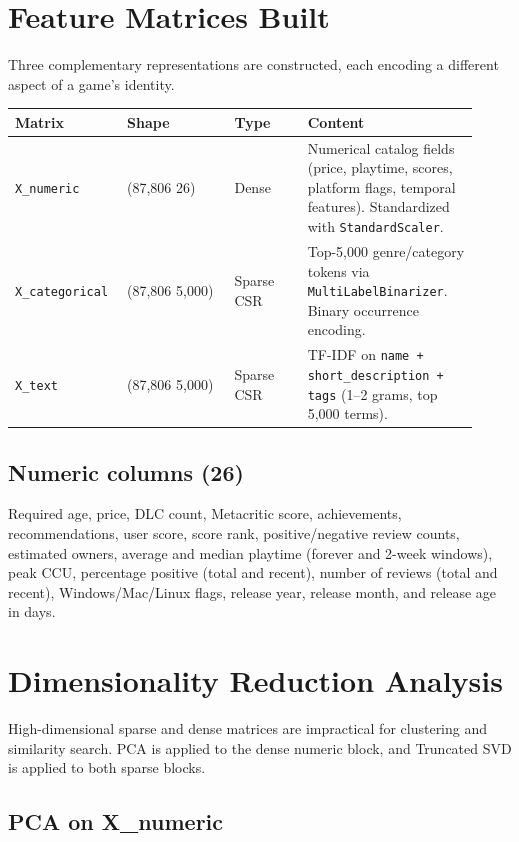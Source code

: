 \documentclass[11pt,a4paper]{article}
\begin{document}
\section{Feature Matrices Built}

Three complementary representations are constructed, each encoding a different aspect of a game's identity.

\begin{longtable}{p{0.20\linewidth}p{0.22\linewidth}p{0.15\linewidth}p{0.35\linewidth}}
\toprule
\textbf{Matrix} & \textbf{Shape} & \textbf{Type} & \textbf{Content} \\
\midrule
\texttt{X\_numeric} & (87,806 \texttimes{} 26) & Dense & Numerical catalog fields (price, playtime, scores, platform flags, temporal features). Standardized with \texttt{StandardScaler}. \\
\midrule
\texttt{X\_categorical} & (87,806 \texttimes{} 5,000) & Sparse CSR & Top-5,000 genre/category tokens via \texttt{MultiLabelBinarizer}. Binary occurrence encoding. \\
\midrule
\texttt{X\_text} & (87,806 \texttimes{} 5,000) & Sparse CSR & TF-IDF on \texttt{name + short\_description + tags} (1--2 grams, top 5,000 terms). \\
\bottomrule
\end{longtable}

\subsection*{Numeric columns (26)}
Required age, price, DLC count, Metacritic score, achievements, recommendations, user score, score rank, positive/negative review counts, estimated owners, average and median playtime (forever and 2-week windows), peak CCU, percentage positive (total and recent), number of reviews (total and recent), Windows/Mac/Linux flags, release year, release month, and release age in days.

\section{Dimensionality Reduction Analysis}

High-dimensional sparse and dense matrices are impractical for clustering and similarity search. PCA is applied to the dense numeric block, and Truncated SVD is applied to both sparse blocks.

\subsection*{PCA on X\_numeric}
\end{document}
